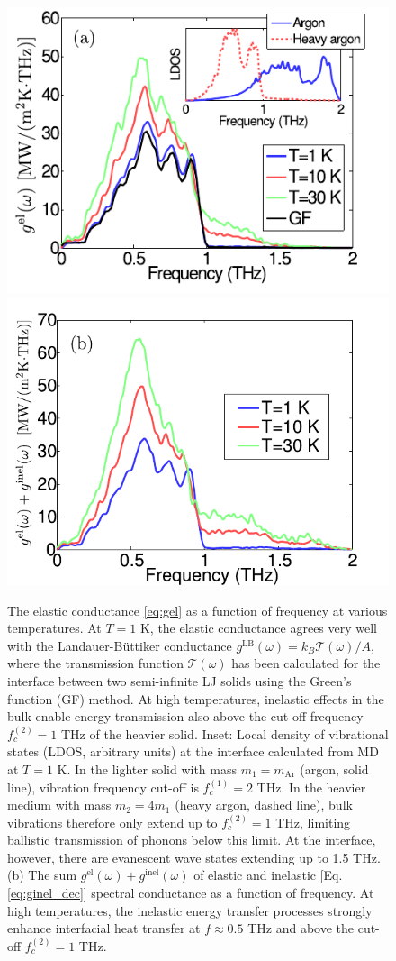 \begin{figure}[tb]
 \begin{center}
  \includegraphics[width=.49\columnwidth]{pics/nemd_fig4a.pdf}
  \includegraphics[width=.49\columnwidth]{pics/nemd_fig4b.pdf}
  \caption{The elastic conductance  \eqref{eq:gel} as a function of frequency at various temperatures. At $T=1$ K, the elastic conductance agrees very well with the Landauer-B\"uttiker conductance $g^{\textrm{LB}} (\omega)=k_B \mathcal{T}(\omega)/A$, where the transmission function $\mathcal{T}(\omega)$ has been calculated for the interface between two semi-infinite LJ solids using the Green's function (GF) method. At high temperatures, inelastic effects in the bulk enable energy transmission also above the cut-off frequency $f_c^{(2)}=1$ THz of the heavier solid. Inset: Local density of vibrational states (LDOS, arbitrary units) at the interface calculated from MD at $T=1$ K. In the lighter solid with mass $m_1=m_{\textrm{Ar}}$ (argon, solid line), vibration frequency cut-off is $f_c^{(1)}=2$ THz. In the heavier medium with mass $m_2=4m_1$ (heavy argon, dashed line), bulk vibrations therefore only extend up to $f_c^{(2)}=1$ THz, limiting ballistic transmission of phonons below this limit. At the interface, however, there are evanescent wave states extending up to 1.5 THz. (b) The sum $g^{\textrm{el}}(\omega)+ g^{\textrm{inel}}(\omega)$ of elastic and inelastic [Eq. \eqref{eq:ginel_dec}] spectral conductance as a function of frequency. At high temperatures, the inelastic energy transfer processes strongly enhance interfacial heat transfer at $f\approx 0.5$ THz and above the cut-off $f_c^{(2)}=1$ THz.} 
 \label{fig:nemd_fig2}
 \end{center}
\end{figure}

